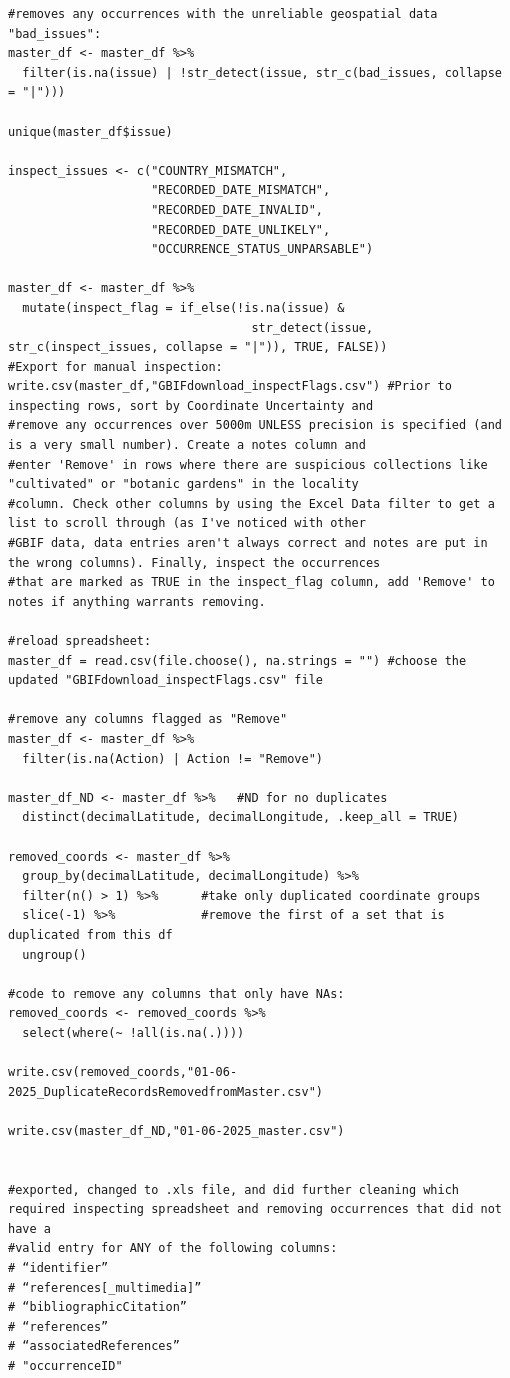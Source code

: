 \documentclass[
]{article}
\begin{document}
\begin{verbatim}
#removes any occurrences with the unreliable geospatial data "bad_issues":
master_df <- master_df %>%
  filter(is.na(issue) | !str_detect(issue, str_c(bad_issues, collapse = "|")))

unique(master_df$issue)

inspect_issues <- c("COUNTRY_MISMATCH",
                    "RECORDED_DATE_MISMATCH",
                    "RECORDED_DATE_INVALID",
                    "RECORDED_DATE_UNLIKELY",
                    "OCCURRENCE_STATUS_UNPARSABLE")

master_df <- master_df %>%
  mutate(inspect_flag = if_else(!is.na(issue) &
                                  str_detect(issue, str_c(inspect_issues, collapse = "|")), TRUE, FALSE))
#Export for manual inspection:
write.csv(master_df,"GBIFdownload_inspectFlags.csv") #Prior to inspecting rows, sort by Coordinate Uncertainty and
#remove any occurrences over 5000m UNLESS precision is specified (and is a very small number). Create a notes column and
#enter 'Remove' in rows where there are suspicious collections like "cultivated" or "botanic gardens" in the locality
#column. Check other columns by using the Excel Data filter to get a list to scroll through (as I've noticed with other
#GBIF data, data entries aren't always correct and notes are put in the wrong columns). Finally, inspect the occurrences
#that are marked as TRUE in the inspect_flag column, add 'Remove' to notes if anything warrants removing.

#reload spreadsheet:
master_df = read.csv(file.choose(), na.strings = "") #choose the updated "GBIFdownload_inspectFlags.csv" file

#remove any columns flagged as "Remove"
master_df <- master_df %>%
  filter(is.na(Action) | Action != "Remove")

master_df_ND <- master_df %>%   #ND for no duplicates
  distinct(decimalLatitude, decimalLongitude, .keep_all = TRUE)

removed_coords <- master_df %>%
  group_by(decimalLatitude, decimalLongitude) %>%
  filter(n() > 1) %>%      #take only duplicated coordinate groups
  slice(-1) %>%            #remove the first of a set that is duplicated from this df
  ungroup()

#code to remove any columns that only have NAs:
removed_coords <- removed_coords %>%
  select(where(~ !all(is.na(.))))

write.csv(removed_coords,"01-06-2025_DuplicateRecordsRemovedfromMaster.csv")

write.csv(master_df_ND,"01-06-2025_master.csv")


#exported, changed to .xls file, and did further cleaning which required inspecting spreadsheet and removing occurrences that did not have a
#valid entry for ANY of the following columns:
# “identifier”
# “references[_multimedia]”
# “bibliographicCitation”
# “references”
# “associatedReferences”
# "occurrenceID"
\end{verbatim}
\end{document}
